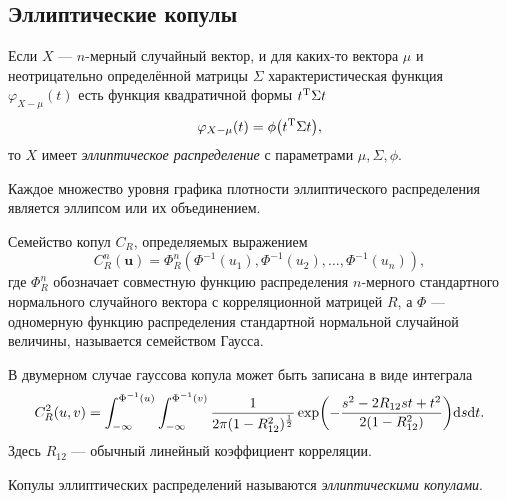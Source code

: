 \subsection*{Эллиптические копулы}

\begin{define}
	Если $X$ --- $n$-мерный случайный вектор, и для каких-то вектора $\mu$ и неотрицательно определённой матрицы $\Sigma$ характеристическая функция $\varphi_{X - \mu}(t)$ есть функция квадратичной формы ${t}^\mathrm{T}\Sigma t$
	\[
	\varphi_{X - \mu}(t) = \phi\brts*{\trans{t} \Sigma t},
	\]
то $X$ имеет \emph{эллиптическое распределение}\cite{Cambanis1981368} с параметрами $\mu, \Sigma, \phi$.
\end{define}

Каждое множество уровня графика плотности эллиптического распределения является эллипсом или их объединением.

\begin{define}
	Семейство копул $C_R$, определяемых выражением\cite{Embrechts01modellingdependence}
\[
C_R^n(\bm{u}) = \Phi_R^n(\Phi^{-1}(u_1), \Phi^{-1}(u_2), \ldots, \Phi^{-1}(u_n)),
\]
где $\Phi_R^n$ обозначает совместную функцию распределения $n$-мерного стандартного нормального случайного вектора с корреляционной матрицей $R$, а $\Phi$ --- одномерную функцию распределения стандартной нормальной случайной величины,
называется семейством Гаусса.
\end{define}

В двумерном случае гауссова копула может быть записана в виде интеграла
\[
C_R^2(u, v) = \int_{-\infty}^{\Phi^{-1}(u)} \int_{-\infty}^{\Phi^{-1}(v)}\frac{1}{2\pi(1 - R_{12}^2)^\frac{1}{2}}\operatorname{exp} \brts*{-\frac{s^2 - 2R_{12}st + t^2}{2(1 - R_{12}^2)}}\d s\d t.
\]
Здесь $R_{12}$ --- обычный линейный коэффициент корреляции.

\begin{define}
	Копулы эллиптических распределений называются \emph{эллиптическими копулами}.
\end{define}



